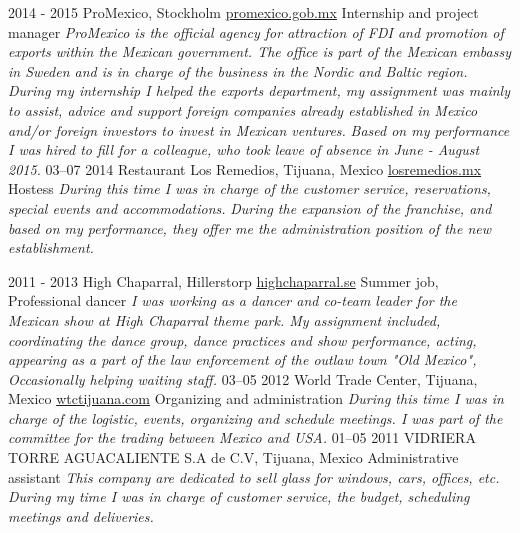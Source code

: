 \documentclass[]{friggeri-cv}
\begin{document}
\begin{entrylist}
  \bigentry
    {2014 - 2015}
    {ProMexico, Stockholm \newline
        {\href{http://www.promexico.gob.mx/en/mx/stockholm}{promexico.gob.mx}}
    }
    {Internship and project manager}
    {\emph{ProMexico is the official agency
    for attraction of FDI and promotion of exports within the Mexican government. The office is
    part of the Mexican embassy in Sweden and is in charge of the business in the Nordic and Baltic region.
    During my internship I helped the exports
    department, my assignment was mainly to assist, advice and
    support foreign companies already established in Mexico and/or
    foreign investors to invest in Mexican ventures.
    }
    }
    {\textit{ Based on my performance I was hired to fill for a colleague, who took
    leave of absence in June - August 2015.}}
  \bigentry
    {03–07 2014}
    {Restaurant Los Remedios, Tijuana, Mexico \newline
        {\href{http://www.losremedios.mx/}{losremedios.mx}}
    }
    {Hostess}
    {\emph{During this time I was in charge of the customer service,
    reservations, special events and accommodations.}}
    {\textit{ During the expansion of the franchise, and based on my
    performance, they offer me the administration position of the
    new establishment.}}

  \entry
    {2011 - 2013}
    {High Chaparral, Hillerstorp \newline
        {\href{http://www.highchaparral.se/sv/}{highchaparral.se}}
    }
    {Summer job, Professional dancer}
    {\emph{I was working as a dancer and co-team leader for the Mexican show at High Chaparral
    theme park. My assignment included, coordinating the dance group, dance practices and show
    performance, acting, appearing as a part of the law enforcement of the outlaw town
    "Old Mexico", Occasionally helping waiting staff.}}
  \entry
    {03–05 2012}
    {World Trade Center, Tijuana, Mexico \newline
        {\href{http://www.wtctijuana.com/}{wtctijuana.com}}
    }
    {Organizing and administration}
    {\emph{During this time I was in charge of the logistic,
    events, organizing and schedule meetings.
    I was part of the committee for the trading between
    Mexico and USA.}}
  \entry
    {01–05 2011}
    {VIDRIERA TORRE AGUACALIENTE S.A de C.V, Tijuana, Mexico}
    {Administrative assistant}
    {\emph{This company are dedicated to sell glass for windows, cars,
    offices, etc. During my time I was in charge of customer
    service, the budget, scheduling meetings and deliveries.}}
\end{entrylist}
\end{document}
